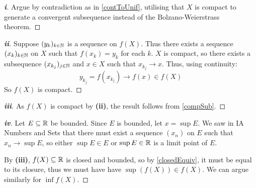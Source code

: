 \documentclass[../main.tex]{subfiles}
\begin{document}
\begin{proof}[\textbf{i}]
  Argue by contradiction as in \cref{contToUnif}, utilising that $X$ is compact to generate a convergent subsequence instead of the Bolzano-Weierstrass theorem.
\end{proof}
\begin{proof}[\textbf{ii}]
  Suppose $(y_k)_{k \in \mathbb{N}}$ is a sequence on $f(X)$.
  Thus there exists a sequence $(x_k)_{k \in \mathbb{N}}$ on $X$ such that $f(x_k) = y_k$ for each $k$.
  $X$ is compact, so there exists a subsequence $(x_{k_j})_{j \in \mathbb{N}}$ and $x \in X$ such that $x_{k_j} \to x$.
  Thus, using continuity:
  \[
    y_{k_j} = f(x_{k_j}) \to f(x) \in f(X)
  \]
  So $f(X)$ is compact.
\end{proof}
\begin{proof}[\textbf{iii}]
  As $f(X)$ is compact by \textbf{(ii)}, the result follows from \cref{compSub}.
\end{proof}
\begin{proof}[\textbf{iv}]
  Let $E \subseteq \mathbb{R}$ be bounded.
  Since $E$ is bounded, let $x = \sup E$.
  We saw in IA Numbers and Sets that there must exist a sequence $(x_n)$ on $E$ such that $x_n \to \sup E$, so either $\sup E \in E$ or $\sup E \in \mathbb{R}$ is a limit point of $E$.

  By \textbf{(iii)}, $f(X) \subseteq \mathbb{R}$ is closed and bounded, so by \cref{closedEquiv}, it must be equal to its closure, thus we must have have $\sup(f(X)) \in f(X)$.
  We can argue similarly for $\inf f(X)$.
\end{proof}
\end{document}
